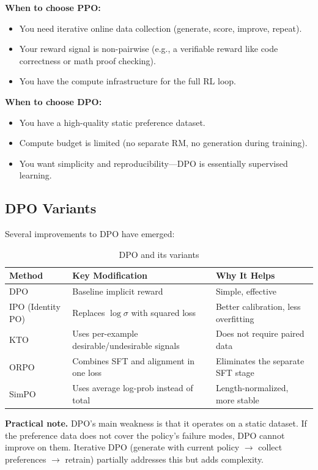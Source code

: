 \textbf{When to choose PPO:}
\begin{itemize}
    \item You need iterative online data collection (generate, score, improve, repeat).
    \item Your reward signal is non-pairwise (e.g., a verifiable reward like code correctness or math proof checking).
    \item You have the compute infrastructure for the full RL loop.
\end{itemize}

\textbf{When to choose DPO:}
\begin{itemize}
    \item You have a high-quality static preference dataset.
    \item Compute budget is limited (no separate RM, no generation during training).
    \item You want simplicity and reproducibility---DPO is essentially supervised learning.
\end{itemize}

\subsection{DPO Variants}

Several improvements to DPO have emerged:

\begin{table}[H]
\centering
\caption{DPO and its variants}
\begin{tabularx}{\textwidth}{lXX}
\toprule
\textbf{Method} & \textbf{Key Modification} & \textbf{Why It Helps} \\
\midrule
DPO & Baseline implicit reward & Simple, effective \\
IPO (Identity PO) & Replaces $\log\sigma$ with squared loss & Better calibration, less overfitting \\
KTO & Uses per-example desirable/undesirable signals & Does not require paired data \\
ORPO & Combines SFT and alignment in one loss & Eliminates the separate SFT stage \\
SimPO & Uses average log-prob instead of total & Length-normalized, more stable \\
\bottomrule
\end{tabularx}
\end{table}

\textbf{Practical note.} DPO's main weakness is that it operates on a static dataset. If the preference data does not cover the policy's failure modes, DPO cannot improve on them. Iterative DPO (generate with current policy $\rightarrow$ collect preferences $\rightarrow$ retrain) partially addresses this but adds complexity.

